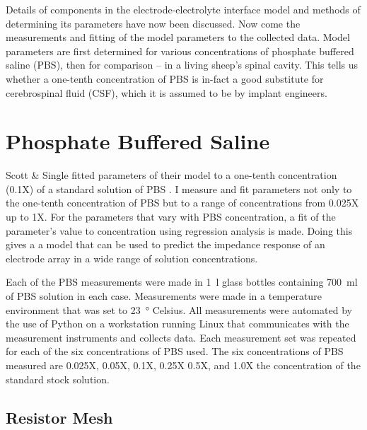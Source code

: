 
Details of components in the electrode-electrolyte interface model and methods of determining its parameters have now been discussed.
Now come the measurements and fitting of the model parameters to the collected data.
Model parameters are first determined for various concentrations of phosphate buffered saline (PBS), then for comparison -- in a living sheep's spinal cavity.
This tells us whether a one-tenth concentration of PBS is in-fact a good substitute for cerebrospinal fluid (CSF), which it is assumed to be by implant engineers.


\section{Phosphate Buffered Saline}
    Scott \& Single fitted parameters of their model to a one-tenth concentration (0.1X) of a standard solution of PBS \cite{Scott2014}.
    I measure and fit parameters not only to the one-tenth concentration of PBS but to a range of concentrations from 0.025X up to 1X.
    For the parameters that vary with PBS concentration, a fit of the parameter's value to concentration using regression analysis is made.
    Doing this gives a a model that can be used to predict the impedance response of an electrode array in a wide range of solution concentrations.

    Each of the PBS measurements were made in \SI{1}{\litre} glass bottles containing \SI{700}{\milli\litre} of PBS solution in each case.
    Measurements were made in a temperature environment that was set to \SI{23}{\degree} Celsius.
    All measurements were automated by the use of Python on a workstation running Linux that communicates with the measurement instruments and collects data.
    Each measurement set was repeated for each of the six concentrations of PBS used.
    The six concentrations of PBS measured are 0.025X, 0.05X, 0.1X, 0.25X 0.5X, and 1.0X the concentration of the standard stock solution.

    \subsection{Resistor Mesh}

